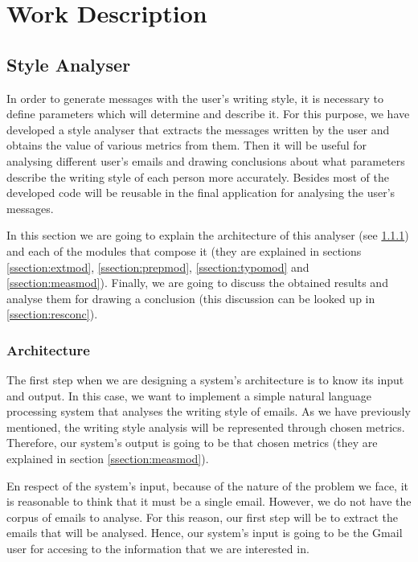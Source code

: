 \chapter{Work Description}
\label{cap:descripcionTrabajo}

\section{Style Analyser}
In order to generate messages with the user's writing style, it is necessary to define parameters which will determine and describe it. For this purpose, we have developed a style analyser that extracts the messages written by the user and obtains the value of various metrics from them. Then it will be useful for analysing different user's emails and drawing conclusions about what parameters describe the writing style of each person more accurately. Besides most of the developed code will be reusable in the final application for analysing the user's messages.

In this section we are going to explain the architecture of this analyser (see \ref{ssection:stylearch}) and each of the modules that compose it (they are explained in sections \ref{ssection:extmod}, \ref{ssection:prepmod}, \ref{ssection:typomod} and \ref{ssection:measmod}). Finally, we are going to discuss the obtained results and analyse them for drawing a conclusion (this discussion can be looked up in \ref{ssection:resconc}).

\subsection{Architecture} \label{ssection:stylearch}
The first step when we are designing a system's architecture is to know its input and output. In this case, we want to implement a simple natural language processing system that analyses the writing style of emails. As we have previously mentioned, the writing style analysis will be represented through chosen metrics. Therefore, our system's output is going to be that chosen metrics (they are explained in section \ref{ssection:measmod}).

En respect of the system's input, because of the nature of the problem we face, it is reasonable to think that it must be a single email. However, we do not have the corpus of emails to analyse. For this reason, our first step will be to extract the emails that will be analysed. Hence, our system's input is going to be the Gmail user for accesing to the information that we are interested in.

